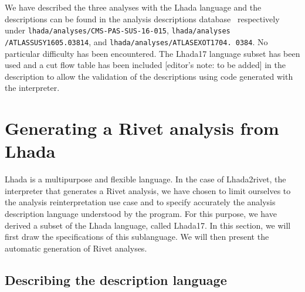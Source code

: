 \documentclass[11pt]{cernrep}
\begin{document}
We have described the three analyses with the {\sc Lhada} language and the descriptions can be found in the analysis descriptions database~\cite{bib:lhada_git} respectively under {\tt lhada/analyses/CMS-PAS-SUS-16-015}, {\tt lhada/analyses /ATLASSUSY1605.03814}, and {\tt lhada/analyses/ATLASEXOT1704. 0384}. No particular difficulty has been encountered. The {\sc Lhada17} language subset has been used and a cut flow table has been included [editor's note: to be added] in the description to allow the validation of the descriptions using code generated with the interpreter.


\section{Generating a Rivet analysis from {\sc Lhada}}

{\sc Lhada} is a multipurpose and flexible language. In the case of {\sc Lhada2rivet}, the interpreter that generates a Rivet analysis, we have chosen to limit ourselves to the analysis reinterpretation use case and to specify accurately the analysis description language understood by the program. For this purpose, we have derived a subset of the {\sc Lhada} language, called {\sc Lhada17}. In this section, we will first draw the specifications of this sublanguage. We will then present the automatic generation of Rivet analyses.

\subsection{Describing the description language}\label{sec:desc}

\end{document}
